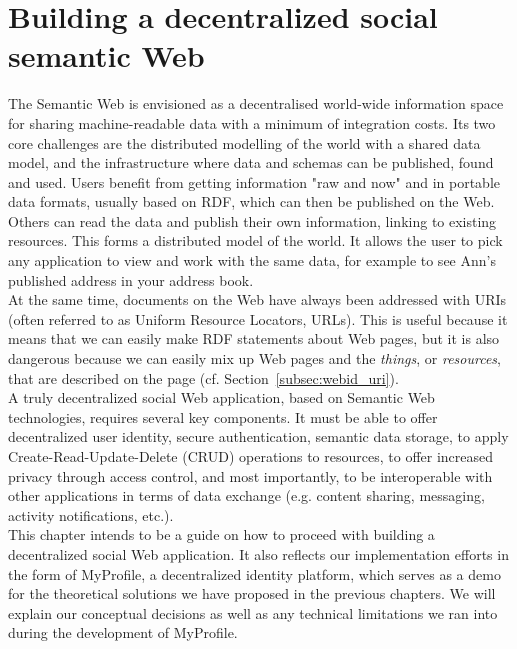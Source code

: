 \chapter{Building a decentralized social semantic Web}
\label{ch:implementations}
The Semantic Web is envisioned as a decentralised world-wide information space for sharing machine-readable data with a minimum of integration costs. Its two core challenges are the distributed modelling of the world with a shared data model, and the infrastructure where data and schemas can be published, found and used. Users benefit from getting information "raw and now" and in portable data formats, usually based on RDF, which can then be published on the Web. Others can read the data and publish their own information, linking to existing resources. This forms a distributed model of the world. It allows the user to pick any application to view and work with the same data, for example to see Ann's published address in your address book.\\

At the same time, documents on the Web have always been addressed with URIs (often referred to as Uniform Resource Locators, URLs). This is useful because it means that we can easily make RDF statements about Web pages, but it is also dangerous because we can easily mix up Web pages and the \textit{things}, or \textit{resources}, that are described on the page (cf. Section~\ref{subsec:webid_uri}).\\

A truly decentralized social Web application, based on Semantic Web technologies, requires several key components. It must be able to offer decentralized user identity, secure authentication, semantic data storage, to apply Create-Read-Update-Delete (CRUD) operations to resources, to offer increased privacy through access control, and most importantly, to be interoperable with other applications in terms of data exchange (e.g. content sharing, messaging, activity notifications, etc.).\\

This chapter intends to be a guide on how to proceed with building a decentralized social Web application. It also reflects our implementation efforts in the form of MyProfile, a decentralized identity platform, which serves as a demo for the theoretical solutions we have proposed in the previous chapters. We will explain our conceptual decisions as well as any technical limitations we ran into during the development of MyProfile.\\

